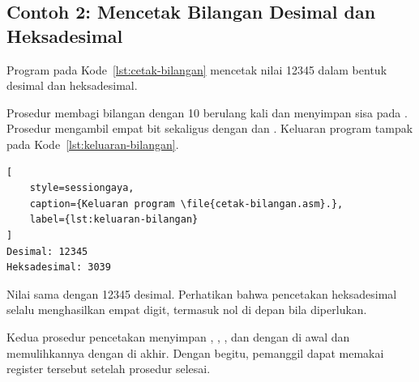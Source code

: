 \subsection{Contoh 2: Mencetak Bilangan Desimal dan Heksadesimal}

Program pada Kode~\ref{lst:cetak-bilangan} mencetak nilai 12345
dalam bentuk desimal dan heksadesimal.



Prosedur  membagi bilangan dengan 10 berulang
kali dan menyimpan sisa pada . Prosedur
 mengambil empat bit sekaligus dengan 
dan . Keluaran program tampak pada
Kode~\ref{lst:keluaran-bilangan}.

\begin{lstlisting}[
    style=sessiongaya,
    caption={Keluaran program \file{cetak-bilangan.asm}.},
    label={lst:keluaran-bilangan}
]
Desimal: 12345
Heksadesimal: 3039
\end{lstlisting}

Nilai  sama dengan 12345 desimal. Perhatikan bahwa
pencetakan heksadesimal selalu menghasilkan empat digit, termasuk
nol di depan bila diperlukan.

\begin{infobox}
\vspace{1.1em}
Kedua prosedur pencetakan menyimpan , , ,
dan  dengan  di awal dan memulihkannya dengan
 di akhir. Dengan begitu, pemanggil dapat memakai register
tersebut setelah prosedur selesai.
\end{infobox}
